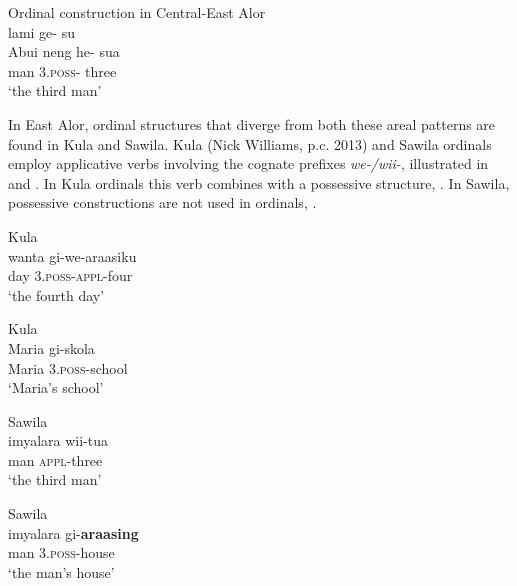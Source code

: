\ea%
\label{bkm:Ref342309284}
{\upshape Ordinal construction in Central-East Alor}\\ 
   lami  ge- su \\  
    {\upshape Abui}     neng  he-  sua   \\
    { }  man  3\textsc{.poss-}  three\\
\glt  `the third man'
\z 



\let\eachwordone=\itshape
\let\eachwordtwo=\upshape 

In East Alor, ordinal structures that diverge from both these areal patterns are found in Kula and Sawila. Kula (Nick Williams, p.c. 2013) and Sawila ordinals employ applicative verbs involving the cognate prefixes \textit{we-/wii-}, illustrated in  and . In Kula ordinals this verb combines with a possessive structure, . In Sawila, possessive constructions  are not used in ordinals, . 


\ea%
\label{bkm:Ref355275027}
 
{\upshape Kula}\\
\gll wanta   gi-we-araasiku\\  
  day   3.\textsc{poss}{}-\textsc{appl}{}-four  \\
\glt  `the fourth day'
\z
 

\ea%
\label{bkm:Ref358037937}
{\upshape Kula}\\
\gll Maria   gi-skola\\  
   Maria   3.\textsc{poss-}school \\
\glt`Maria's school'
\z
 
  

  


\ea%
\label{bkm:Ref355277550}
{\upshape Sawila}\\
\gll   imyalara   wii-tua\\  
   man    \textsc{appl-}three \\
\glt  `the third man'
\z

  

  




\ea%
\label{bkm:Ref342737790}
{\upshape Sawila}\\
\gll imyalara   gi-\textbf{araasing} \\  
    man    3.\textsc{poss}-house   \\
\glt`the man's house'
\z
 

